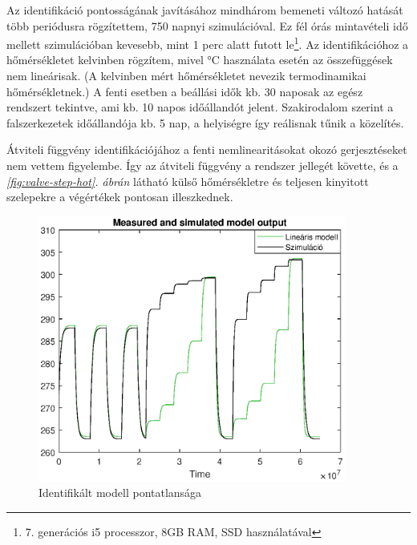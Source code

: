 Az identifikáció pontosságának javításához mindhárom bemeneti változó hatását több periódusra rögzítettem, 750 napnyi szimulációval. Ez fél órás mintavételi idő mellett szimulációban kevesebb, mint 1 perc alatt futott le\footnote{7. generációs i5 processzor, 8GB RAM, SSD használatával}. Az identifikációhoz a hőmérsékletet kelvinben rögzítem, mivel \si{\celsius} használata esetén az összefüggések nem lineárisak. (A kelvinben mért hőmérsékletet nevezik termodinamikai hőmérsékletnek.) A fenti esetben a beállási idők kb. 30 naposak az egész rendszert tekintve, ami kb. 10 napos időállandót jelent. Szakirodalom szerint a falszerkezetek időállandója kb. 5 nap, a helyiségre így reálisnak tűnik a közelítés.

Átviteli függvény identifikációjához a fenti nemlinearitásokat okozó gerjesztéseket nem vettem figyelembe. Így az átviteli függvény a rendszer jellegét követte, és a \textit{\ref{fig:valve-step-hot}. ábrán} látható külső hőmérsékletre és teljesen kinyitott szelepekre a végértékek pontosan illeszkednek.


\begin{figure}[H]
	\centering
	\includegraphics[trim=0 0 0 0, clip,width=0.9\textwidth]{figures/identModelOutputMatch}
	\caption{Identifikált modell pontatlansága}
	\label{fig:ident-model-mismatch}
\end{figure}

%
%
%
%


\pagebreak